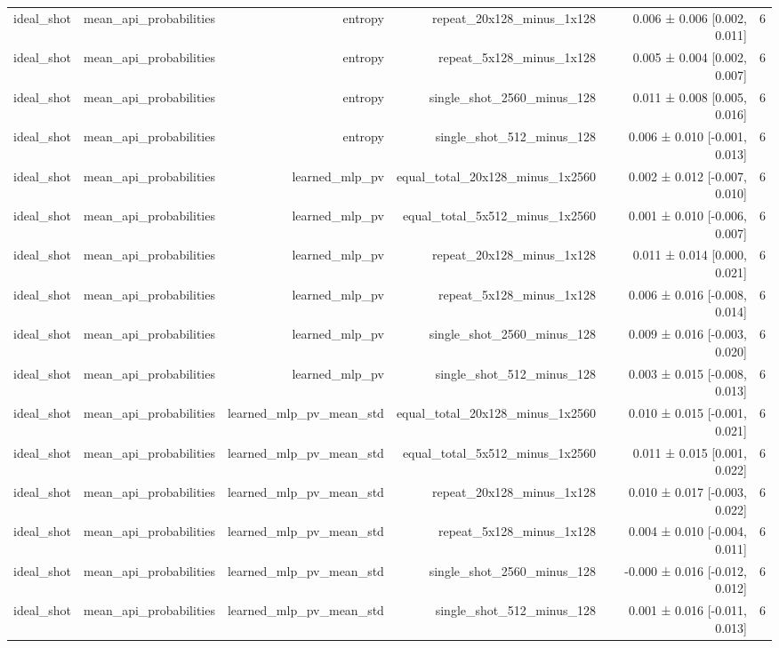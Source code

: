 \begin{table}
\begin{tabular}{lrrrrr}
ideal\_shot & mean\_api\_probabilities & entropy & repeat\_20x128\_minus\_1x128 & 0.006 ± 0.006 [0.002, 0.011] & 6 \\
ideal\_shot & mean\_api\_probabilities & entropy & repeat\_5x128\_minus\_1x128 & 0.005 ± 0.004 [0.002, 0.007] & 6 \\
ideal\_shot & mean\_api\_probabilities & entropy & single\_shot\_2560\_minus\_128 & 0.011 ± 0.008 [0.005, 0.016] & 6 \\
ideal\_shot & mean\_api\_probabilities & entropy & single\_shot\_512\_minus\_128 & 0.006 ± 0.010 [-0.001, 0.013] & 6 \\
ideal\_shot & mean\_api\_probabilities & learned\_mlp\_pv & equal\_total\_20x128\_minus\_1x2560 & 0.002 ± 0.012 [-0.007, 0.010] & 6 \\
ideal\_shot & mean\_api\_probabilities & learned\_mlp\_pv & equal\_total\_5x512\_minus\_1x2560 & 0.001 ± 0.010 [-0.006, 0.007] & 6 \\
ideal\_shot & mean\_api\_probabilities & learned\_mlp\_pv & repeat\_20x128\_minus\_1x128 & 0.011 ± 0.014 [0.000, 0.021] & 6 \\
ideal\_shot & mean\_api\_probabilities & learned\_mlp\_pv & repeat\_5x128\_minus\_1x128 & 0.006 ± 0.016 [-0.008, 0.014] & 6 \\
ideal\_shot & mean\_api\_probabilities & learned\_mlp\_pv & single\_shot\_2560\_minus\_128 & 0.009 ± 0.016 [-0.003, 0.020] & 6 \\
ideal\_shot & mean\_api\_probabilities & learned\_mlp\_pv & single\_shot\_512\_minus\_128 & 0.003 ± 0.015 [-0.008, 0.013] & 6 \\
ideal\_shot & mean\_api\_probabilities & learned\_mlp\_pv\_mean\_std & equal\_total\_20x128\_minus\_1x2560 & 0.010 ± 0.015 [-0.001, 0.021] & 6 \\
ideal\_shot & mean\_api\_probabilities & learned\_mlp\_pv\_mean\_std & equal\_total\_5x512\_minus\_1x2560 & 0.011 ± 0.015 [0.001, 0.022] & 6 \\
ideal\_shot & mean\_api\_probabilities & learned\_mlp\_pv\_mean\_std & repeat\_20x128\_minus\_1x128 & 0.010 ± 0.017 [-0.003, 0.022] & 6 \\
ideal\_shot & mean\_api\_probabilities & learned\_mlp\_pv\_mean\_std & repeat\_5x128\_minus\_1x128 & 0.004 ± 0.010 [-0.004, 0.011] & 6 \\
ideal\_shot & mean\_api\_probabilities & learned\_mlp\_pv\_mean\_std & single\_shot\_2560\_minus\_128 & -0.000 ± 0.016 [-0.012, 0.012] & 6 \\
ideal\_shot & mean\_api\_probabilities & learned\_mlp\_pv\_mean\_std & single\_shot\_512\_minus\_128 & 0.001 ± 0.016 [-0.011, 0.013] & 6 \\

\end{tabular}
\end{table}
